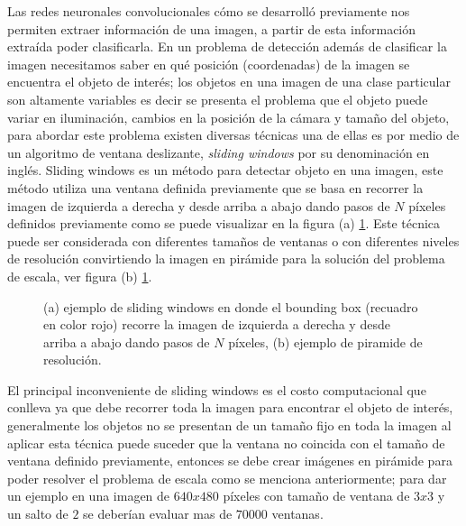 Las redes neuronales convolucionales cómo se desarrolló previamente nos permiten extraer información de una imagen, a partir de esta información extraída poder clasificarla. En un problema de detección además de clasificar la imagen necesitamos saber en qué posición (coordenadas) de la imagen se encuentra el objeto de interés; los objetos en una imagen de una clase particular son altamente variables es decir se presenta el problema que el objeto puede variar en iluminación, cambios en la posición de la cámara y tamaño del objeto, para abordar este problema existen diversas técnicas una de ellas es por medio de un algoritmo de ventana deslizante, \textit{sliding windows} por su denominación en inglés. Sliding windows es un método para detectar objeto en una imagen, este método utiliza una ventana definida previamente que se basa en recorrer la imagen de izquierda a derecha y desde arriba a abajo dando pasos de $N$ píxeles definidos previamente como se puede visualizar en la figura (a) \ref{Fig:sliding}. Este técnica puede ser considerada con diferentes tamaños de ventanas o con diferentes niveles de resolución convirtiendo la imagen en pirámide para la solución del problema de escala, ver figura (b) \ref{Fig:sliding}.


\begin{figure}[htbp]
\centering
{}

\caption{(a) ejemplo de sliding windows en donde el bounding box (recuadro en color rojo) recorre la imagen de izquierda a derecha y desde arriba a abajo dando pasos de $N$ píxeles, (b) ejemplo de piramide de resolución.}\label{Fig:sliding}
\end{figure}







El principal inconveniente de sliding windows es el costo computacional que conlleva ya que debe recorrer toda la imagen para encontrar el objeto de interés, generalmente los objetos no se presentan de un tamaño fijo en toda la imagen al aplicar esta técnica puede suceder que la ventana no coincida con el tamaño de ventana definido previamente, entonces se debe crear imágenes en pirámide para poder resolver el problema de escala como se menciona anteriormente; para dar un ejemplo en una imagen de $640 x 480$ píxeles con tamaño de ventana de $ 3 x 3$ y un salto de $2$ se deberían evaluar mas de $70000$ ventanas.

